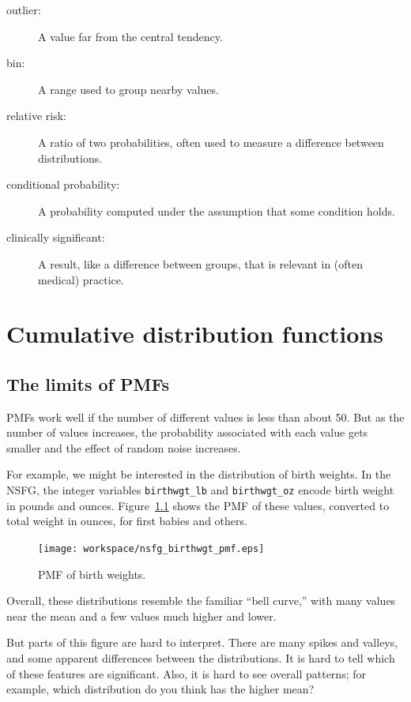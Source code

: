 \documentclass[12pt]{book}
\begin{document}
\begin{description}
\item[outlier:] A value far from the central tendency.

\item[bin:] A range used to group nearby values.

\item[relative risk:] A ratio of two probabilities, often used to measure
a difference between distributions.

\item[conditional probability:] A probability computed under the assumption
that some condition holds.

\item[clinically significant:] A result, like a difference between groups,
that is relevant in (often medical) practice.

\end{description}


\chapter{Cumulative distribution functions}
\label{cumulative}

\section{The limits of PMFs}

PMFs work well if the number of different values is less than
about 50.  But as the number of values increases, the probability
associated with each value gets smaller and the effect of random noise
increases.

For example, we might be interested in the distribution of birth
weights.  In the NSFG, the integer variables \verb"birthwgt_lb" and
\verb"birthwgt_oz" encode birth weight in pounds and ounces.
Figure~\ref{nsfg_birthwgt_pmf} shows the PMF of these values,
converted to total weight in ounces, for first babies and others.

\begin{figure}
\centerline{\texttt{[image: workspace/nsfg\_birthwgt\_pmf.eps]}}
\caption{PMF of birth weights.}
\label{nsfg_birthwgt_pmf}
\end{figure}

Overall, these distributions resemble the familiar ``bell curve,'' with
many values near the mean and a few values much higher and lower.

But parts of this figure are hard to interpret.  There are many spikes
and valleys, and some apparent differences between the distributions.
It is hard to tell which of these features are significant.  Also, it
is hard to see overall patterns; for example, which distribution do
you think has the higher mean?
\end{document}
